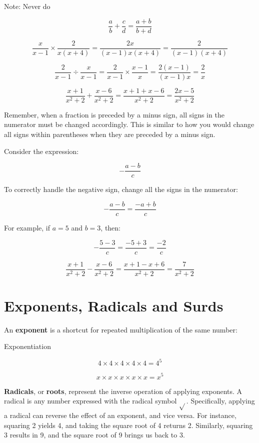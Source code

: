 Note: Never do

\[
\frac{a}{b} + \frac{c}{d} = \frac{a + b}{b + d}
\]   

\begin{example}

\[
\frac{x}{x - 1} \times \frac{2}{x(x + 4)} = \frac{2x}{(x - 1)x(x + 4)} = \frac{2}{(x - 1)(x + 4)}
\]

\[
\frac{2}{x - 1} \div \frac{x}{x - 1} = \frac{2}{x - 1} \times \frac{x - 1}{x} = \frac{2(x - 1)}{(x - 1)x} = \frac{2}{x}
\]

\[
\frac{x + 1}{x^2 + 2} + \frac{x - 6}{x^2 + 2} = \frac{x + 1 + x - 6}{x^2 + 2} = \frac{2x - 5}{x^2 + 2}
\]    
\end{example}

Remember, when a fraction is preceded by a minus sign, all signs in the numerator must be changed accordingly. This is similar to how you would change all signs within parentheses when they are preceded by a minus sign.

Consider the expression:

\[
-\frac{a - b}{c}
\]

To correctly handle the negative sign, change all the signs in the numerator:

\[
-\frac{a - b}{c} = \frac{-a + b}{c}
\]

For example, if \(a = 5\) and \(b = 3\), then:

\[
-\frac{5 - 3}{c} = \frac{-5 + 3}{c} = \frac{-2}{c}
\]

\begin{example}

\[
\frac{x + 1}{x^2 + 2} - \frac{x - 6}{x^2 + 2} = \frac{x + 1 - x + 6}{x^2 + 2} = \frac{7}{x^2 + 2}
\]    
\end{example}

\section{Exponents, Radicals and Surds}
An \textbf{exponent} is a shortcut for repeated multiplication of the same number:

\begin{example} Exponentiation

\[
4 \times 4 \times 4 \times 4 \times 4 = 4^5
\]

\[
x \times x \times x \times x \times x = x^5
\]  
\end{example}

\textbf{Radicals}, or \textbf{roots}, represent the inverse operation of applying exponents. A radical is any number expressed with the radical symbol \(\sqrt{}\). Specifically, applying a radical can reverse the effect of an exponent, and vice versa. For instance, squaring 2 yields 4, and taking the square root of 4 returns 2. Similarly, squaring 3 results in 9, and the square root of 9 brings us back to 3.

